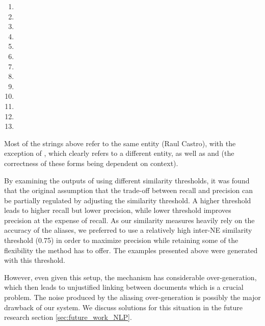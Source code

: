 \begin{enumerate}
 \item {}
 \item {}
 \item {}
 \item {}
 \item {}
 \item {}
 \item {}
 \item {}
 \item {}
 \item {}
 \item {}
 \item {}
 \item {}
\end{enumerate}

Most of the strings above refer to the same entity (Raul Castro), with the exception of , which clearly refers to a different entity, as well as  and  (the correctness of these forms being dependent on context).

By examining the outputs of using different similarity thresholds, it was found that the original assumption that the trade-off between recall and precision can be partially regulated by adjusting the similarity threshold. A higher threshold leads to higher recall but lower precision, while lower threshold improves precision at the expense of recall. As our similarity measures heavily rely on the accuracy of the aliases, we preferred to use a relatively high inter-NE similarity threshold (0.75) in order to maximize precision while retaining some of the flexibility the method has to offer. The examples presented above were generated with this threshold.

However, even given this setup, the mechanism has considerable over-generation, which then leads to unjustified linking between documents which is a crucial problem. The noise produced by the aliasing over-generation is possibly the major drawback of our system. We discuss solutions for this situation in the future research section \ref{sec:future_work_NLP}.


